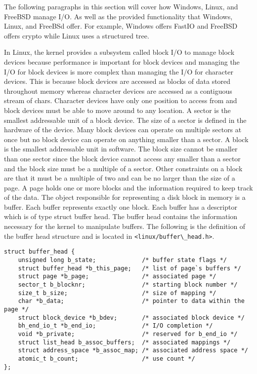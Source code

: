 \documentclass[letterpaper,10pt,draftclsnofoot,onecolumn,]{IEEEtran}
\begin{document}

The following paragraphs in this section will cover how Windows, Linux, and FreeBSD manage I/O. As well as the provided functionality that Windows, Linux, and FreeBSd offer. For example, Windows offers FastIO and FreeBSD offers crypto while Linux uses a structured tree.

In Linux, the kernel provides a subsystem called block I/O to manage block devices because performance is important for block devices and managing the I/O for block devices is more complex than managing the I/O for character devices. This is because block devices are accessed as blocks of data stored throughout memory whereas character devices are accessed as a contiguous stream of chars. Character devices have only one position to access from and block devices must be able to move around to any location. A sector is the smallest addressable unit of a block device. The size of a sector is defined in the hardware of the device. Many block devices can operate on multiple sectors at once but no block device can operate on anything smaller than a sector. A block is the smallest addressable unit in software. The block size cannot be smaller than one sector since the block device cannot access any smaller than a sector and the block size must be a multiple of a sector. Other constraints on a block are that it must be a multiple of two and can be no larger than the size of a page. A page holds one or more blocks and the information required to keep track of the data. The object responsible for representing a disk block in memory is a buffer. Each buffer represents exactly one block. Each buffer has a descriptor which is of type struct buffer head. The buffer head contains the information necessary for the kernel to manipulate buffers. The following is the definition of the buffer head structure and is located in \verb|<linux/buffer\_head.h>|.

\begin{lstlisting}
struct buffer_head {
    unsigned long b_state;             /* buffer state flags */
    struct buffer_head *b_this_page;   /* list of page`s buffers */
    struct page *b_page;               /* associated page */
    sector_t b_blocknr;                /* starting block number */
    size_t b_size;                     /* size of mapping */
    char *b_data;                      /* pointer to data within the page */
    struct block_device *b_bdev;       /* associated block device */
    bh_end_io_t *b_end_io;             /* I/O completion */
    void *b_private;                   /* reserved for b_end_io */
    struct list_head b_assoc_buffers;  /* associated mappings */
    struct address_space *b_assoc_map; /* associated address space */
    atomic_t b_count;                  /* use count */
};
\end{lstlisting}
\end{document}
